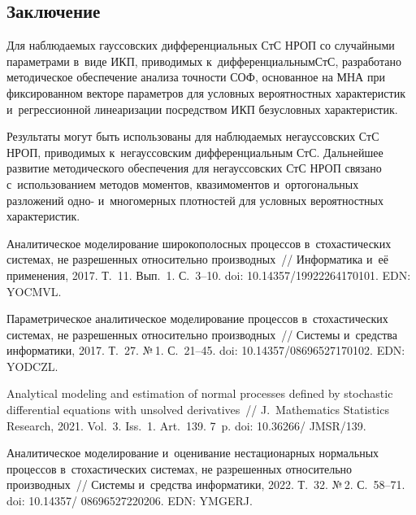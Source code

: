 \begin{multicols}{2}
\section{ Заключение}

\vspace*{-12pt}

Для наблюдаемых гауссовских дифферен\-ци\-альных СтС НРОП со случайными па\-ра\-мет\-ра\-ми 
в~виде ИКП, приводимых к~дифференциальным\linebreak СтС, разработано методическое 
обеспечение анализа точ\-ности СОФ, основанное на МНА при фиксированном векторе параметров для условных 
\mbox{вероятностных} характеристик и~регрессионной линеаризации посредством ИКП 
безусловных характеристик.

Результаты могут быть использованы для наблюдаемых негауссовских СтС НРОП, 
приводимых к~негауссовским дифференциальным СтС.
Дальнейшее развитие методического обеспечения для негауссовских СтС НРОП связано с~использованием методов моментов, квазимоментов и~ортогональных разложений 
одно- и~многомерных плотностей для условных вероятностных характеристик.

\vspace*{-12pt}

{\small\frenchspacing
 { %
 \begin{thebibliography}{99}
 
 \vspace*{-12pt}
 
Аналитическое моделирование широкополосных процессов в~стохастических системах, 
не разрешенных относительно производных~// Информатика и~её применения, 2017. 
Т.~11. Вып.~1. С.~3--10. doi: 10.14357/19922264170101. EDN: YOCMVL.

Параметрическое аналитическое моделирование процессов в~стохастических  
системах, не разрешенных относительно производных~// Системы и~средства 
информатики, 2017. Т.~27. №\,1. С.~21--45. doi: 10.14357/08696527170102. EDN: 
YODCZL.

Analytical modeling and estimation of normal processes defined by stochastic 
differential equations with unsolved derivatives~// J.~Mathematics Statistics 
Research, 2021. Vol.~3. Iss.~1. Art.~139. 7~p. doi: 10.36266/ \mbox{JMSR}/139.

Аналитическое моделирование и~оценивание нестационарных нормальных процессов 
в~стохастических системах, не разрешенных относительно производных~// Сис\-те\-мы 
и~средства информатики, 2022. Т.~32. №\,2. С.~58--71. doi: 10.14357/ 08696527220206. 
EDN: YMGERJ.



\end{thebibliography}}}
\end{multicols}
